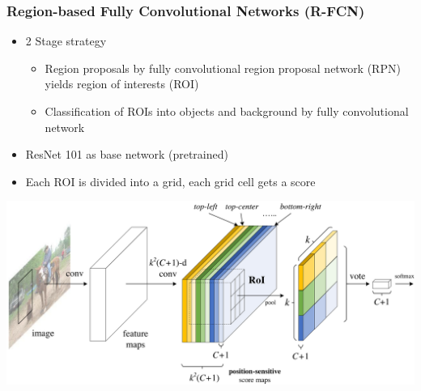 \subsubsection{Region-based Fully Convolutional Networks (R-FCN)}
\begin{itemize}
    \item 2 Stage strategy
          \begin{itemize}
              \item Region proposals by fully convolutional region proposal network (RPN) yields region of interests (ROI)
              \item Classification of ROIs into objects and background by fully convolutional network
          \end{itemize}
    \item ResNet 101 as base network (pretrained)
    \item Each ROI is divided into a grid, each grid cell gets a score
\end{itemize}

\includegraphics[width=.7\textwidth]{sections/FindingMultipleObjects/img/rfcn}


